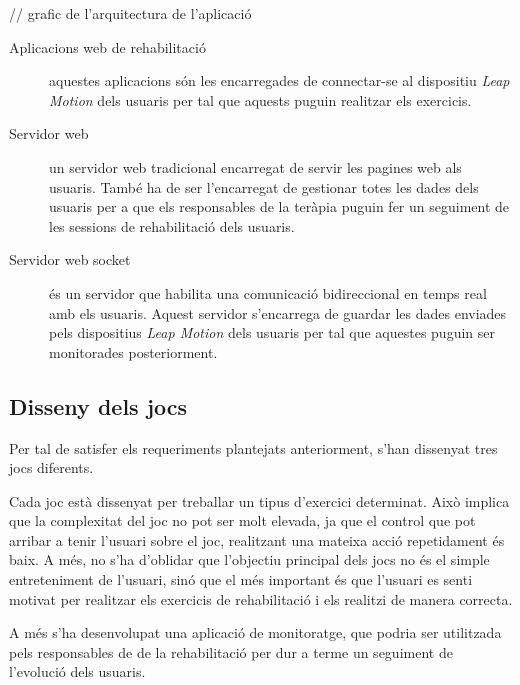 \documentclass[12pt,a4paper,catalan]{article}
\begin{document}
	// grafic de l'arquitectura de l'aplicació
	
	\begin{description}
		\item [Aplicacions web de rehabilitació] aquestes aplicacions són les encarregades de connectar-se al dispositiu \textit{Leap Motion} dels usuaris per tal que aquests puguin realitzar els exercicis.
		\item [Servidor web] un servidor web tradicional encarregat de servir les pagines web als usuaris. També ha de ser l'encarregat de gestionar totes les dades dels usuaris per a que els responsables de la teràpia puguin fer un seguiment de les sessions de rehabilitació dels usuaris.
		\item [Servidor web socket] és un servidor que habilita una comunicació bidireccional en temps real amb els usuaris. Aquest servidor s'encarrega de guardar les dades enviades pels dispositius \textit{Leap Motion} dels usuaris per tal que aquestes puguin ser monitorades posteriorment.
	\end{description}
	\subsection{Disseny dels jocs}
	Per tal de satisfer els requeriments plantejats anteriorment, s'han dissenyat tres jocs diferents.
	
	Cada joc està dissenyat per treballar un tipus d'exercici determinat. Això implica que la complexitat del joc no pot ser molt elevada, ja que el control que pot arribar a tenir l'usuari sobre el joc, realitzant una mateixa acció repetidament és baix. A més, no s'ha d'oblidar que l'objectiu principal dels jocs no és el simple entreteniment de l'usuari, sinó que el més important és que l'usuari es senti motivat per realitzar els exercicis de rehabilitació i els realitzi de manera correcta.
	
	A més s'ha desenvolupat una aplicació de monitoratge, que podria ser utilitzada pels responsables de de la rehabilitació per dur a terme un seguiment de l'evolució dels usuaris.
\end{document}

